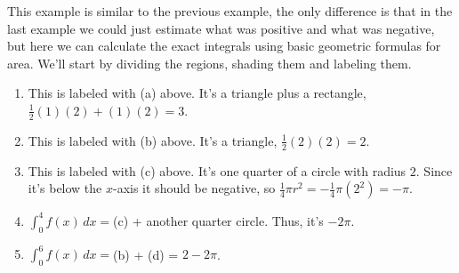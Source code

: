 \documentclass[oneside]{book}
\theoremstyle{definition}
\theoremstyle{solution}
\newtheorem*{solution}{Solution}
\newenvironment{solution}{\vspace{2in}\comment}{\endcomment}
\begin{document}
\begin{solution}
  This example is similar to the previous example, the only difference
  is that in the last example we could just estimate what was positive
  and what was negative, but here we can calculate the exact integrals
  using basic geometric formulas for area.  We'll start by dividing
  the regions, shading them and labeling them.
\begin{center}
\end{center}

\begin{enumerate}
\item This is labeled with (a) above.  It's a triangle plus a
  rectangle, $\frac 12 (1)(2) + (1)(2) = 3$.

\item This is labeled with (b) above.  It's a triangle,
  $\frac 12 (2)(2) = 2$.

\item This is labeled with (c) above.  It's one quarter of a circle
  with radius $2$.  Since it's below the $x$-axis it should be
  negative, so $\frac 14 \pi r^2 = - \frac 14 \pi (2^2) = - \pi$.

\item $ \int_0^4 f(x)\,dx = $(c) + another quarter circle.  Thus, it's
  $-2\pi$.

\item $ \int_0^6 f(x)\,dx = $(b) + (d) = $2-2\pi$.
\end{enumerate}
\end{solution}
\end{document}
